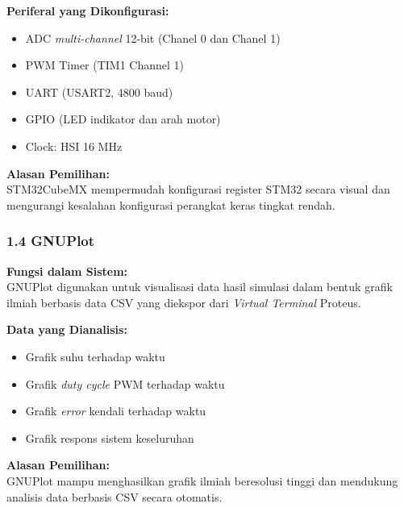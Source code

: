 \documentclass[11pt,a4paper]{article}
\begin{document}
\noindent\textbf{Periferal yang Dikonfigurasi:}
\begin{itemize}
    \item ADC \textit{multi-channel} 12-bit (Chanel 0 dan Chanel 1)
    \item PWM Timer (TIM1 Channel 1)
    \item UART (USART2, 4800 baud)
    \item GPIO (LED indikator dan arah motor)
    \item Clock: HSI 16 MHz
\end{itemize}
\vspace{6pt}
\noindent\textbf{Alasan Pemilihan:}\\
STM32CubeMX mempermudah konfigurasi register STM32 secara visual dan mengurangi
kesalahan konfigurasi perangkat keras tingkat rendah.
\subsubsection*{1.4 GNUPlot}
\noindent\textbf{Fungsi dalam Sistem:}\\
GNUPlot digunakan untuk visualisasi data hasil simulasi dalam bentuk grafik
ilmiah berbasis data CSV yang diekspor dari \textit{Virtual Terminal} Proteus.
\vspace{6pt}

\noindent\textbf{Data yang Dianalisis:}
\begin{itemize}
    \item Grafik suhu terhadap waktu
    \item Grafik \textit{duty cycle} PWM terhadap waktu
    \item Grafik \textit{error} kendali terhadap waktu
    \item Grafik respons sistem keseluruhan
\end{itemize}
\vspace{6pt}
\noindent\textbf{Alasan Pemilihan:}\\
GNUPlot mampu menghasilkan grafik ilmiah beresolusi tinggi dan mendukung analisis
data berbasis CSV secara otomatis.
\end{document}
